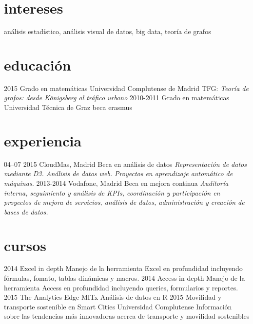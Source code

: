 \documentclass[]{friggeri-cv}
\begin{document}
\section{intereses}

análisis estadístico, análisis visual de datos, big data, teoría de grafos

\section{educación}

\begin{entrylist}
  \entry
    {2015}
    {Grado {\normalfont en matemáticas}}
    {Universidad Complutense de Madrid}
    {TFG: \emph{Teoría de grafos: desde Königsberg al tráfico urbano}}
  \entry
    {2010-2011}
    {Grado {\normalfont en matemáticas}}
    {Universidad Técnica de Graz}
    {beca erasmus}
\end{entrylist}

\section{experiencia}

\begin{entrylist}
  \entry
    {04–07 2015}
    {CloudMas, Madrid}
    {Beca en análisis de datos}
    {\emph{Representación de datos mediante D3. Análisis de datos web. Proyectos en aprendizaje automático de máquinas.}}
  \entry
    {2013-2014}
    {Vodafone, Madrid}
    {Beca en mejora continua}
    {\emph{Auditoría interna, seguimiento y análisis de KPIs, coordinación y participación en proyectos de mejora de servicios, análisis de datos, administración y creación de bases de datos.}}
\end{entrylist}

\section{cursos}

\begin{entrylist}
  \entry
    {2014}
    {Excel in depth}
    {}
    {{Manejo de la herramienta Excel en profundidad incluyendo fórmulas, fomato, tablas dinámicas y macros.}}
  \entry
    {2014}
    {Access in depth}
    {}
    {Manejo de la herramienta Access en profundidad incluyendo queries, formularios y reportes.}
  \entry
    {2015}
    {The Analytics Edge}
    {MITx}
    {Análisis de datos en R}
  \entry
    {2015}
    {Movilidad y transporte sostenible en Smart Cities}
    {Universidad Complutense}
    {Información sobre las tendencias más innovadoras acerca de
transporte y movilidad sostenibles}
\end{entrylist}
\end{document}
